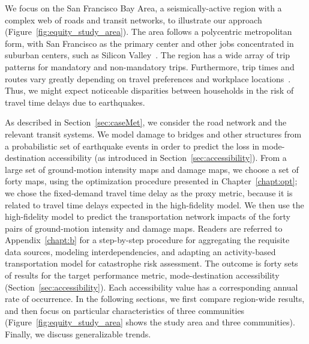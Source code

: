 We focus on the San Francisco Bay Area, a seismically-active region with a complex web of roads and transit networks, to illustrate our approach (Figure~\ref{fig:equity_study_area}). The area follows a polycentric metropolitan form, with San Francisco as the primary center and other jobs  concentrated in suburban centers, such as Silicon Valley~\cite{cervero_polycentrism_1997}. The region has a wide array of trip patterns for mandatory and non-mandatory trips. Furthermore, trip times and routes vary greatly depending on travel preferences and workplace locations~\cite{cervero_polycentrism_1997}. Thus,  we might expect noticeable disparities between households in the risk of travel time delays due to earthquakes. 


As described in Section~\ref{sec:caseMet}, we consider the road network and the relevant transit systems. We  model damage to bridges and other structures from a probabilistic set of earthquake events in order to predict the loss in mode-destination accessibility (as introduced in Section~\ref{sec:accessibility}).
From a large set of ground-motion intensity maps and damage maps, we choose a set of forty maps, using the optimization procedure presented in Chapter~\ref{chapt:opt}; we chose the fixed-demand travel time delay as the proxy metric, because it is related to travel time delays expected in the high-fidelity model. We then use the high-fidelity model to predict the transportation network impacts of the forty pairs of ground-motion intensity and damage maps. Readers are referred to Appendix~\ref{chapt:b} for a step-by-step procedure for aggregating the requisite data sources, modeling interdependencies, and adapting an activity-based transportation model for catastrophe risk assessment. The outcome is forty sets of results for the target performance metric, mode-destination accessibility (Section~\ref{sec:accessibility}). Each accessibility value has a corresponding annual rate of occurrence.
In the following sections, we first compare region-wide results, and then focus on particular characteristics of three communities (Figure~\ref{fig:equity_study_area} shows the study area and three communities). Finally, we discuss generalizable trends.

